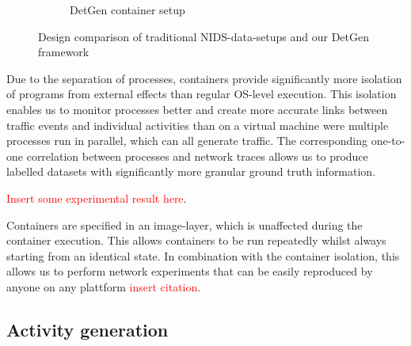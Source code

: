 \documentclass[runningheads]{llncs}
\begin{document}
\begin{figure}
\begin{subfigure}[b]{0.48\textwidth}
\caption{DetGen container setup}
\end{subfigure}
\caption{Design comparison of traditional NIDS-data-setups and our DetGen framework}
\end{figure}


Due to the separation of processes, containers provide significantly more isolation of programs from external effects than regular OS-level execution. This isolation enables us to monitor processes better and create more accurate links between traffic events and individual activities than on a virtual machine were multiple processes run in parallel, which can all generate traffic. The corresponding one-to-one correlation between processes and network traces allows us to produce labelled datasets with significantly more granular ground truth information.

\textcolor{red}{Insert some experimental result here}.

Containers are specified in an image-layer, which is unaffected during the container execution.
This allows containers to be run repeatedly whilst always starting from an identical state. In combination with the container isolation, this allows us to perform network experiments that can be easily reproduced by anyone on any plattform \textcolor{red}{insert citation}. 

 

\subsection{Activity generation}\label{Sec:Scenarios}
\end{document}
